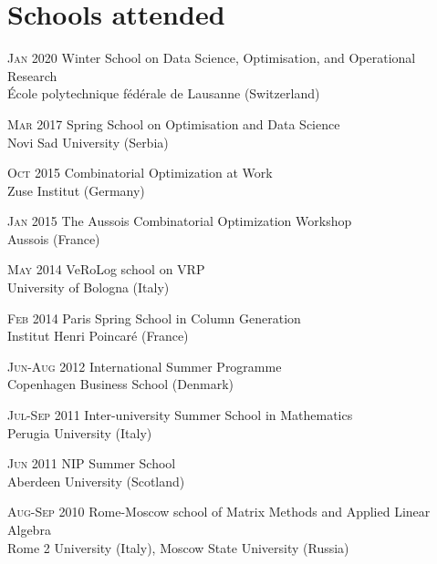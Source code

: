 \section*{Schools attended}

\begin{paracol}{2}
  \textsc{Jan 2020}
\switchcolumn
  Winter School on Data Science, Optimisation, and Operational Research\\
  École polytechnique fédérale de Lausanne (Switzerland)
\end{paracol}

\begin{paracol}{2}
  \textsc{Mar 2017}
\switchcolumn
  Spring School on Optimisation and Data Science\\
  Novi Sad University (Serbia)
\end{paracol}

\begin{paracol}{2}
  \textsc{Oct 2015}
\switchcolumn
  Combinatorial Optimization at Work\\
  Zuse Institut (Germany)
\end{paracol}

\begin{paracol}{2}
  \textsc{Jan 2015}
\switchcolumn
  The Aussois Combinatorial Optimization Workshop\\
  Aussois (France)
\end{paracol}

\begin{paracol}{2}
  \textsc{May 2014}
\switchcolumn
  VeRoLog school on VRP\\
  University of Bologna (Italy)
\end{paracol}

\begin{paracol}{2}
  \textsc{Feb 2014}
\switchcolumn
  Paris Spring School in Column Generation\\
  Institut Henri Poincaré (France)
\end{paracol}

\begin{paracol}{2}
  \textsc{Jun-Aug 2012}
\switchcolumn
  International Summer Programme\\
  Copenhagen Business School (Denmark)
\end{paracol}

\begin{paracol}{2}
  \textsc{Jul-Sep 2011}
\switchcolumn
  Inter-university Summer School in Mathematics\\
  Perugia University (Italy)
\end{paracol}

\begin{paracol}{2}
  \textsc{Jun 2011}
\switchcolumn
  NIP Summer School\\
  Aberdeen University (Scotland)
\end{paracol}

\begin{paracol}{2}
  \textsc{Aug-Sep 2010}
\switchcolumn
  Rome-Moscow school of Matrix Methods and Applied Linear Algebra\\
  Rome 2 University (Italy), Moscow State University (Russia)
\end{paracol}